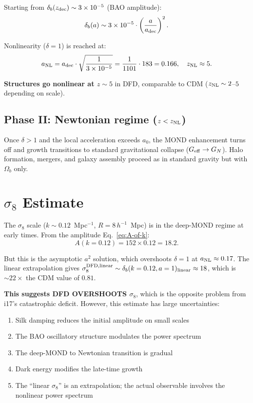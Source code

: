 \documentclass[11pt]{article}
\newcommand{\ee}[1]{\times 10^{#1}}
\newcommand{\Geff}{G_{\rm eff}}
\newcommand{\aM}{a_0}
\begin{document}
Starting from $\delta_b(z_{\rm dec}) \sim 3\ee{-5}$ (BAO amplitude):
\begin{equation}
\delta_b(a) \sim 3\ee{-5}\cdot\left(\frac{a}{a_{\rm dec}}\right)^2.
\end{equation}

Nonlinearity ($\delta = 1$) is reached at:
\begin{equation}
a_{\rm NL} = a_{\rm dec}\cdot\sqrt{\frac{1}{3\ee{-5}}}
= \frac{1}{1101}\cdot 183 = 0.166, \quad z_{\rm NL} \approx 5.
\end{equation}

\textbf{Structures go nonlinear at $z \sim 5$} in DFD, comparable
to CDM ($z_{\rm NL} \sim 2$--$5$ depending on scale).

\subsection{Phase II: Newtonian regime ($z < z_{\rm NL}$)}

Once $\delta > 1$ and the local acceleration exceeds $\aM$, the
MOND enhancement turns off and growth transitions to standard
gravitational collapse ($\Geff \to G_N$). Halo formation, mergers,
and galaxy assembly proceed as in standard gravity but with
$\Omega_b$ only.

\section{$\sigma_8$ Estimate}

The $\sigma_8$ scale ($k \sim 0.12$~Mpc$^{-1}$, $R = 8\,h^{-1}$~Mpc)
is in the deep-MOND regime at early times. From the amplitude
Eq.~\eqref{eq:A-of-k}:
\begin{equation}
A(k = 0.12) = 152\times 0.12 = 18.2.
\end{equation}

But this is the asymptotic $a^2$ solution, which overshoots
$\delta = 1$ at $a_{\rm NL} \approx 0.17$. The linear extrapolation gives
$\sigma_8^{\rm DFD, linear} \sim \delta_b(k=0.12, a=1)_{\rm linear}
\approx 18$, which is $\sim 22\times$ the CDM value of $0.81$.

\textbf{This suggests DFD OVERSHOOTS $\sigma_8$}, which is the
opposite problem from i17's catastrophic deficit. However, this
estimate has large uncertainties:
\begin{enumerate}
\item Silk damping reduces the initial amplitude on small scales
\item The BAO oscillatory structure modulates the power spectrum
\item The deep-MOND to Newtonian transition is gradual
\item Dark energy modifies the late-time growth
\item The ``linear $\sigma_8$'' is an extrapolation; the actual
  observable involves the nonlinear power spectrum
\end{enumerate}
\end{document}
